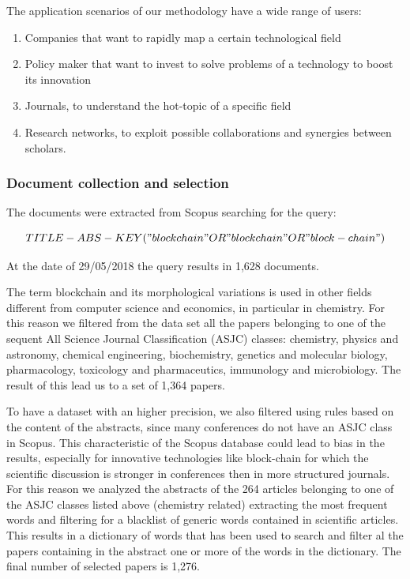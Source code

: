 \documentclass[]{book}
\providecommand{\tightlist}{%
  \setlength{\itemsep}{0pt}\setlength{\parskip}{0pt}}
\theoremstyle{definition}
\theoremstyle{definition}
\theoremstyle{definition}
\theoremstyle{remark}
\begin{document}
The application scenarios of our methodology have a wide range of users:

\begin{enumerate}
\def\labelenumi{\arabic{enumi}.}
\tightlist
\item
  Companies that want to rapidly map a certain technological field
\item
  Policy maker that want to invest to solve problems of a technology to
  boost its innovation
\item
  Journals, to understand the hot-topic of a specific field
\item
  Research networks, to exploit possible collaborations and synergies
  between scholars.
\end{enumerate}

\subsubsection*{Document collection and
selection}\label{document-collection-and-selection}

The documents were extracted from Scopus searching for the query:

\begin{equation*} 
  TITLE-ABS-KEY("blockchain" OR "block chain" OR "block-chain")
\end{equation*}

At the date of 29/05/2018 the query results in 1,628 documents.

The term blockchain and its morphological variations is used in other
fields different from computer science and economics, in particular in
chemistry. For this reason we filtered from the data set all the papers
belonging to one of the sequent All Science Journal Classification
(ASJC) classes: chemistry, physics and astronomy, chemical engineering,
biochemistry, genetics and molecular biology, pharmacology, toxicology
and pharmaceutics, immunology and microbiology. The result of this lead
us to a set of 1,364 papers.

To have a dataset with an higher precision, we also filtered using rules
based on the content of the abstracts, since many conferences do not
have an ASJC class in Scopus. This characteristic of the Scopus database
could lead to bias in the results, especially for innovative
technologies like block-chain for which the scientific discussion is
stronger in conferences then in more structured journals. For this
reason we analyzed the abstracts of the 264 articles belonging to one of
the ASJC classes listed above (chemistry related) extracting the most
frequent words and filtering for a blacklist of generic words contained
in scientific articles. This results in a dictionary of words that has
been used to search and filter al the papers containing in the abstract
one or more of the words in the dictionary. The final number of selected
papers is 1,276.
\end{document}
